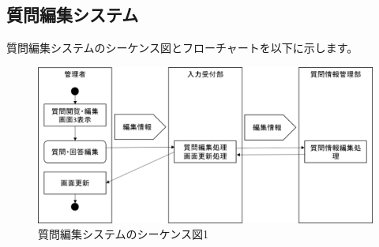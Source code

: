 \newpage
\subsection{質問編集システム}
質問編集システムのシーケンス図とフローチャートを以下に示します。

\begin{figure}[htbp]
  \begin{center}
    \includegraphics[width=0.4\linewidth,clip]{./img/q_edit/main.png}
    \caption{質問編集システムのシーケンス図1}\label{fig:qeditseaquence}
  \end{center}
\end{figure}

